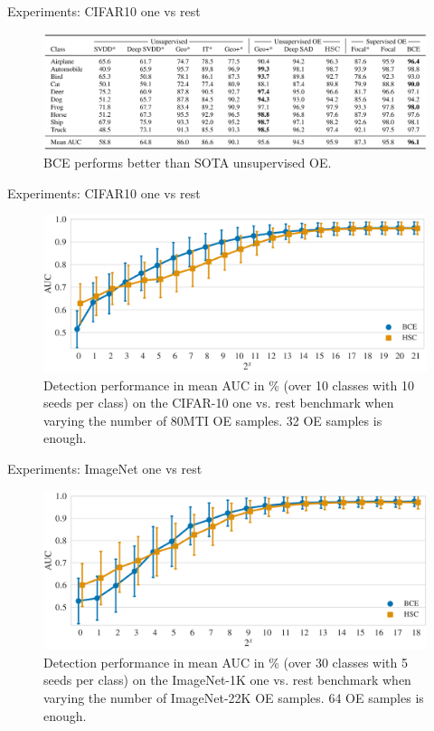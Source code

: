 \documentclass{beamer}
\begin{document}
\begin{frame}{Experiments: CIFAR10 one vs rest}
\begin{figure}[h]
\includegraphics[width=\textwidth]{img/table1}
\caption{BCE performs better than SOTA unsupervised OE.}
\end{figure}

\end{frame}
\begin{frame}{Experiments: CIFAR10 one vs rest}
\begin{figure}[h]
\includegraphics[width=\textwidth]{img/bce_vs_hsc}
\caption{Detection performance in mean AUC in \% (over 10 classes with 10 seeds per class) on the CIFAR-10 one vs. rest benchmark when varying the number of 80MTI OE samples. 32 OE samples is enough.}
\end{figure}
\end{frame}
\begin{frame}{Experiments: ImageNet one vs rest}
\begin{figure}[h]
\includegraphics[width=\textwidth]{img/bce_vs_hsc_imagenet}
\caption{Detection performance in mean AUC in \% (over 30 classes with 5 seeds per class) on the ImageNet-1K one vs. rest benchmark when varying the number of ImageNet-22K OE samples. 64 OE samples is enough.}
\end{figure}
\end{frame}
\end{document}
